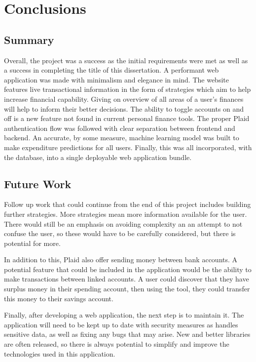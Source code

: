 \chapter{Conclusions}
\label{ch:conclusions}

\section{Summary}
Overall, the project was a success as the initial requirements were met as well as a success in completing the title of this dissertation. A performant web application was made with minimalism and elegance in mind. The website features live transactional information in the form of strategies which aim to help increase financial capability. Giving on overview of all areas of a user's finances will help to inform their better decisions. The ability to toggle accounts on and off is a new feature not found in current personal finance tools. The proper Plaid authentication flow was followed with clear separation between frontend and backend. An accurate, by some measure, machine learning model was built to make expenditure predictions for all users. Finally, this was all incorporated, with the database, into a single deployable web application bundle.

\section{Future Work}
Follow up work that could continue from the end of this project includes building further strategies. More strategies mean more information available for the user. There would still be an emphasis on avoiding complexity an an attempt to not confuse the user, so these would have to be carefully considered, but there is potential for more.

In addition to this, Plaid also offer sending money between bank accounts. A potential feature that could be included in the application would be the ability to make transactions between linked accounts. A user could discover that they have surplus money in their spending account, then using the tool, they could transfer this money to their savings account.

Finally, after developing a web application, the next step is to maintain it. The application will need to be kept up to date with security measures as handles sensitive data, as well as fixing any bugs that may arise. New and better libraries are often released, so there is always potential to simplify and improve the technologies used in this application.